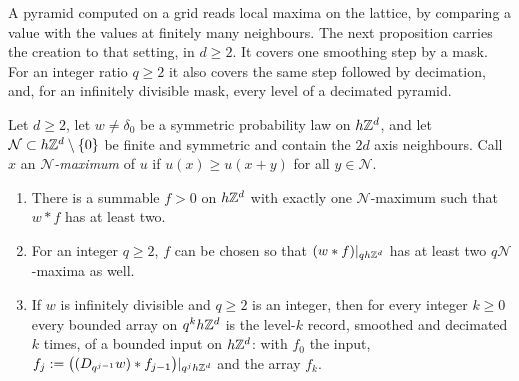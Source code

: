 A pyramid computed on a grid reads local maxima on the lattice, by comparing a value with the
values at finitely many neighbours. The next proposition carries the creation to that setting, in
$d \ge 2$. It covers one smoothing step by a mask. For an integer ratio $q \ge 2$ it also covers
the same step followed by decimation, and, for an infinitely divisible mask, every level of a
decimated pyramid.

\begin{proposition}
\label{prop:creation-grid}

Let $d \ge 2$, let $w \ne \delta_0$ be a symmetric probability law on $h\mathbb{Z}^d$, and let
$\mathcal{N} \subset h\mathbb{Z}^d \setminus \{0\}$ be finite and symmetric and
contain the $2d$ axis neighbours. Call $x$ an \emph{$\mathcal{N}$-maximum} of $u$ if
$u(x) \ge u(x + y)$ for all $y \in \mathcal{N}$.
\begin{enumerate}
\item There is a summable $f > 0$ on $h\mathbb{Z}^d$ with exactly one $\mathcal{N}$-maximum such that
$w * f$ has at least two.
\item For an integer $q \ge 2$, $f$ can be chosen so that $(w * f)|_{qh\mathbb{Z}^d}$ has at least two
$q\mathcal{N}$-maxima as well.
\item If $w$ is infinitely divisible and $q \ge 2$ is an integer, then for every integer $k \ge 0$
every bounded array on $q^kh\mathbb{Z}^d$ is the level-$k$ record, smoothed and decimated $k$ times, of a bounded input on
$h\mathbb{Z}^d$: with $f_0$ the input, $f_j := \bigl((D_{q^{j-1}}w) * f_{j-1}\bigr)|_{q^jh\mathbb{Z}^d}$ and the
array $f_k$.
\end{enumerate}
\end{proposition}

